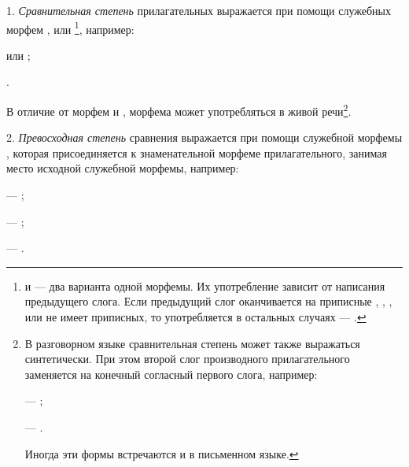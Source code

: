 1. \emph{Сравнительная степень} прилагательных выражается при помощи служебных морфем ,  или \footnote[29]{ и  --- два варианта одной морфемы. Их употребление зависит от написания предыдущего слога. Если предыдущий слог оканчивается на приписные , , ,  или не имеет приписных, то употребляется  в остальных случаях --- .}, например:
\begin{prfsample}
    \item {} или ;
    \item {}.
\end{prfsample}
В отличие от морфем  и , морфема  может употребляться в живой речи\footnote[30]{В разговорном языке сравнительная степень может также выражаться синтетически. При этом второй слог производного прилагательного заменяется на конечный согласный первого слога, например:
\begin{prfsample}
    \item {} --- ;
    \item {} --- .
\end{prfsample}
Иногда эти формы встречаются и в письменном языке.}.

2. \emph{Превосходная степень} сравнения выражается при помощи служебной морфемы , которая присоединяется к знаменательной морфеме прилагательного, занимая место исходной служебной морфемы, например:
\begin{prfsample}
    \item {} --- ;
    \item {} --- ;
    \item {} --- .
\end{prfsample}

